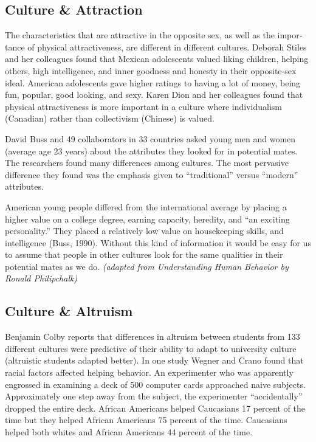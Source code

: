 \documentclass[
]{book}
\begin{document}
\hypertarget{culture-attraction}{%
\subsection*{Culture \& Attraction}\label{culture-attraction}}

The characteristics that are attractive in the opposite sex, as well as the impor­tance of physical attractiveness, are different in different cultures. Deborah Stiles and her colleagues found that Mexican adolescents valued liking children, helping others, high intelligence, and inner goodness and honesty in their oppo­site-sex ideal. American adolescents gave higher ratings to having a lot of money, being fun, popular, good looking, and sexy. Karen Dion and her colleagues found that physical attractiveness is more impor­tant in a culture where individualism (Canadian) rather than collectivism (Chinese) is valued.

David Buss and 49 collaborators in 33 countries asked young men and women (average age 23 years) about the attributes they looked for in potential mates. The researchers found many differences among cultures. The most pervasive difference they found was the emphasis given to ``traditional'' versus ``modern'' attributes.

American young people differed from the international average by placing a higher value on a college degree, earning capacity, heredity, and ``an exciting personality.'' They placed a relatively low value on housekeeping skills, and intelligence (Buss, 1990). Without this kind of information it would be easy for us to assume that people in other cultures look for the same qualities in their potential mates as we do. \emph{(adapted from Understanding Human Behavior by Ronald Philipchalk)}

\hypertarget{culture-altruism}{%
\subsection*{Culture \& Altruism}\label{culture-altruism}}

Benjamin Colby reports that differences in altruism between stu­dents from 133 different cultures were predictive of their ability to adapt to university culture (altruistic students adapted better). In one study Wegner and Crano found that racial fac­tors affected helping behavior. An exper­i­menter who was apparently engrossed in examining a deck of 500 computer cards approached naive subjects. Approximately one step away from the subject, the experimenter ``accidentally'' dropped the entire deck. African Americans helped Caucasians 17 percent of the time but they helped African Americans 75 percent of the time. Caucasians helped both whites and African Americans 44 percent of the time.
\end{document}

